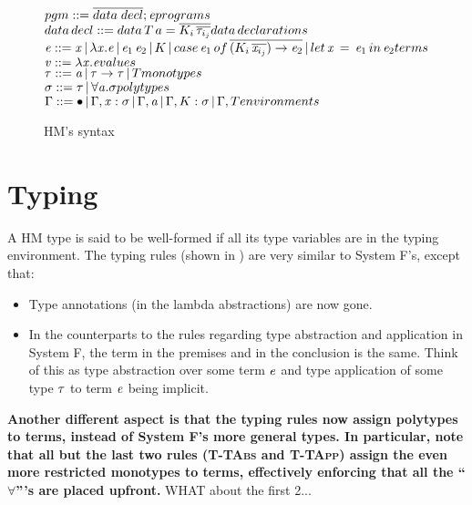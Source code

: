 \begin{figure}
  $pgm::= \overline{data\;decl};\term\hfill programs$\\
  $data\,decl::= data\,T\,a=\overline{K_i\,\overline{\type_{i_j}}}\hfill data\,declarations$\\
  $\term ::= \tmVar\,|\,\lambda \tmVar.\term\,|\,\term_1 \, \term_2 \,|\,K\,|\,case \, \term_1 \, of\, \overline{(K_i \, \overline{\tmVar_{i_j}}) \rightarrow \term_2} \,|\, let \, \tmVar \, =\, \term_1 \,in\, \term_2 \hfill terms $\\
  $\tmVal::= \lambda \tmVar.\term \hfill values$\\
  $\type ::= \tyVar\,|\,\type \rightarrow \type\,|\,T \hfill monotypes$\\
  $\sigma ::= \type \,|\,\forall \tyVar.\sigma \hfill polytypes$\\
  $\tyEnv::=  \bullet \,|\, \tyEnv, \tmVar:\typeS\,|\, \tyEnv,\tyVar\,|\,\tyEnv, K : \typeS\,|\,\tyEnv, T \hfill environments$\\
  \caption{HM's syntax}
  \label{hmsyntax}
\end{figure}

\section{Typing}
A HM type is said to be well-formed if all its type variables are in the typing environment. The typing rules (shown in ) are very similar to System F's, except that:
\begin{itemize}
\item Type annotations (in the lambda abstractions) are now gone.
\item In the counterparts to the rules regarding type abstraction and application in System F, the term in the premises and in the conclusion is the same. Think of this as type abstraction over some term $\mathit{e}$ and type application of some type $\mathit{\tau}$ to term $\mathit{e}$ being implicit.
\end{itemize}
\textbf{Another different aspect is that the typing rules now assign polytypes to terms, instead of System F's more general types. In particular, note that all but the last two rules (\textsc{T-TAbs} and \textsc{T-TApp}) assign the even more restricted monotypes to terms, effectively enforcing that all the ``$\forall$'''s are placed upfront.} WHAT about the first 2...
  


